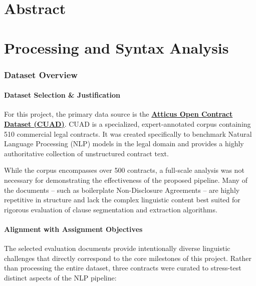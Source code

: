\documentclass[twoside,final]{hcmut-report}
\begin{document}
\fancyfoot{}
\coverpage\clearpage

\tableofcontents\clearpage
\setcounter{page}{1}

\part*{Abstract}
\clearpage
\part{Processing and Syntax Analysis}
\label{assignment_1}
\section{Dataset Overview}
\subsection*{Dataset Selection \& Justification}
For this project, the primary data source is the \href{https://www.kaggle.com/datasets/konradb/atticus-open-contract-dataset-aok-beta}{\textbf{Atticus Open Contract Dataset (CUAD)}}. CUAD is a specialized, expert-annotated corpus containing 510 commercial legal contracts. It was created specifically to benchmark Natural Language Processing (NLP) models in the legal domain and provides a highly authoritative collection of unstructured contract text.

\medskip
While the corpus encompasses over 500 contracts, a full-scale analysis was not necessary for demonstrating the effectiveness of the proposed pipeline. Many of the documents -- such as boilerplate Non-Disclosure Agreements -- are highly repetitive in structure and lack the complex linguistic content best suited for rigorous evaluation of clause segmentation and extraction algorithms.

\subsection*{Alignment with Assignment Objectives}
The selected evaluation documents provide intentionally diverse linguistic challenges that directly correspond to the core milestones of this project. Rather than processing the entire dataset, three contracts were curated to stress-test distinct aspects of the NLP pipeline:
\end{document}
